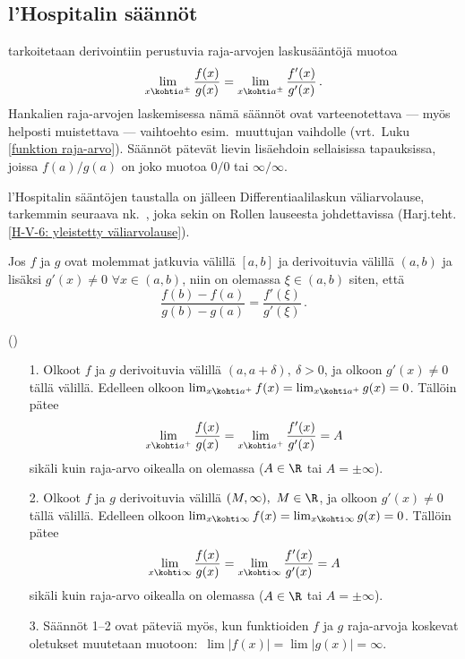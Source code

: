 \subsection*{l'Hospitalin säännöt}

 tarkoitetaan derivointiin perustuvia raja-arvojen
laskusääntöjä muotoa
\[
\lim_{x \kohti a^\pm} \frac{f(x)}{g(x)} = \lim_{x \kohti a^\pm} \frac{f'(x)}{g'(x)}\,.
\]
Hankalien raja-arvojen laskemisessa nämä säännöt ovat varteenotettava --- myös helposti
muistettava --- vaihtoehto esim.\ muuttujan vaihdolle (vrt.\ Luku \ref{funktion raja-arvo}).
Säännöt pätevät lievin lisäehdoin sellaisissa tapauksissa, joissa $f(a)/g(a)$ on joko muotoa
$0/0$ tai $\infty/\infty$.

l'Hospitalin sääntöjen taustalla on jälleen Differentiaalilaskun väliarvolause, tarkemmin
seuraava nk.\ , joka sekin on Rollen lauseesta johdettavissa
(Harj.teht.\,\ref{H-V-6: yleistetty väliarvolause}).
\begin{Lause} \label{yleistetty väliarvolause} 
 Jos $f$ ja $g$ ovat
molemmat jatkuvia välillä $[a,b]$ ja derivoituvia välillä $(a,b)$ ja lisäksi $g'(x) \neq 0$
$\forall x\in(a,b)$, niin on olemassa $\xi\in(a,b)$ siten, että
\[
\frac{f(b)-f(a)}{g(b)-g(a)} = \frac{f'(\xi)}{g'(\xi)}\,.
\]
\end{Lause}
\begin{Lause} () \label{Hospital} 
\begin{itemize}
\item[1.] Olkoot $f$ ja $g$ derivoituvia välillä $(a,a+\delta),\ \delta>0$, ja olkoon
          $g'(x) \neq 0$ tällä välillä. Edelleen olkoon
          $\lim_{x \kohti a^+}f(x)=\lim_{x \kohti a^+}g(x) = 0$. Tällöin pätee
          \[
          \lim_{x \kohti a^+} \frac{f(x)}{g(x)} = \lim_{x \kohti a^+} \frac{f'(x)}{g'(x)} = A
          \]
          sikäli kuin raja-arvo oikealla on olemassa ($A\in\R$ tai $A=\pm\infty$).
\item[2.] Olkoot $f$ ja $g$ derivoituvia välillä $(M,\infty),\ M\in\R$, ja olkoon
          $g'(x) \neq 0$ tällä välillä. Edelleen olkoon
          $\lim_{x\kohti\infty}f(x)=\lim_{x\kohti\infty}g(x)=0$. Tällöin pätee
          \[
          \lim_{x\kohti\infty} \frac{f(x)}{g(x)} = \lim_{x\kohti\infty} \frac{f'(x)}{g'(x)} = A
          \]
          sikäli kuin raja-arvo oikealla on olemassa ($A\in\R$ tai $A=\pm\infty$).
\item[3.] Säännöt 1--2 ovat päteviä myös, kun funktioiden $f$ ja $g$ raja-arvoja koskevat
          oletukset muutetaan muotoon: $\,\lim|f(x)|=\lim|g(x)|=\infty$.
\end{itemize}
\end{Lause}
